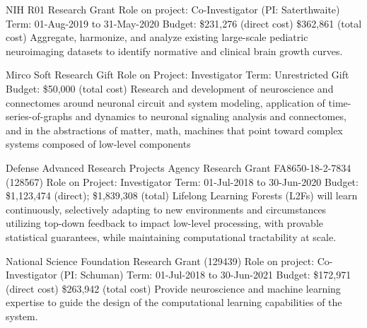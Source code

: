\documentclass[10pt,colorlinks=true,urlcolor=blue]{moderncv}
\begin{document}
{\newline NIH R01 Research Grant \newline Role on project: Co-Investigator (PI: Saterthwaite)
\newline Term: 01-Aug-2019 to 31-May-2020
\newline Budget: \$231,276 (direct cost) \$362,861 (total cost)
\newline Aggregate, harmonize, and analyze existing large-scale pediatric neuroimaging datasets to
identify normative and clinical brain growth curves.}{}{}{}{}

{\newline Mirco Soft Research Gift
\newline Role on Project: Investigator
\newline Term: Unrestricted Gift
\newline Budget: \$50,000 (total cost)
\newline Research and development of neuroscience and connectomes around neuronal circuit and
system modeling, application of time-series-of-graphs and dynamics to neuronal signaling
analysis and connectomes, and in the abstractions of matter, math, machines that point
toward complex systems composed of low-level components}{}{}{}{}

{\newline Defense Advanced Research Projects Agency Research Grant FA8650-18-2-7834
(128567)
\newline Role on Project: Investigator
\newline Term: 01-Jul-2018 to 30-Jun-2020
\newline Budget: \$1,123,474 (direct); \$1,839,308 (total)
\newline Lifelong Learning Forests (L2Fs) will learn continuously, selectively adapting to new
environments and circumstances utilizing top-down feedback to impact low-level
processing, with provable statistical guarantees, while maintaining computational tractability
at scale.}{}{}{}{}

{\newline National Science Foundation Research Grant (129439)
\newline Role on project: Co-Investigator (PI: Schuman)
\newline Term: 01-Jul-2018 to 30-Jun-2021
\newline Budget: \$172,971 (direct cost) \$263,942 (total cost)
\newline Provide neuroscience and machine learning expertise to guide the design of the
computational learning capabilities of the system.}{}{}{}{}
\end{document}
